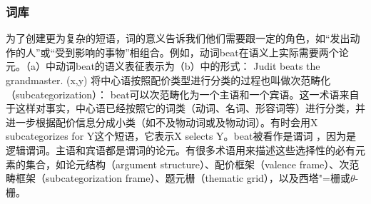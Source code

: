 \subsubsection{词库}
\label{Abschnitt-GB-Lexikon}
为了创建更为复杂的短语，词的意义告诉我们他们需要跟一定的角色，如“发出动作的人”或“受到影响的事物”相组合。例如，动词beat在语义上实际需要两个论元。（a）中动词beat的语义表征表示为（b）中的形式：
\eal
\ex Judit beats the grandmaster.
\ex {}(x,y)
\zl
\noindent
将中心语按照配价类型进行分类的过程也叫做次范畴化（subcategorization）：\label{Seite-Subkategoriesierung} beat可以次范畴化为一个主语和一个宾语。这一术语来自于这样对事实，中心语已经按照它的词类（动词、名词、形容词等）进行分类，并进一步根据配价信息分成小类（如不及物动词或及物动词）。有时会用X subcategorizes for Y这个短语，它表示X selects Y。beat被看作是谓词 ，因为是逻辑谓词。主语和宾语都是谓词的论元。有很多术语用来描述这些选择性的必有元素的集合，如论元结构（argument structure）、配价框架（valence frame）、次范畴框架（subcategorization frame）、题元栅（thematic grid），以及西塔"=栅或$\theta$-栅。
